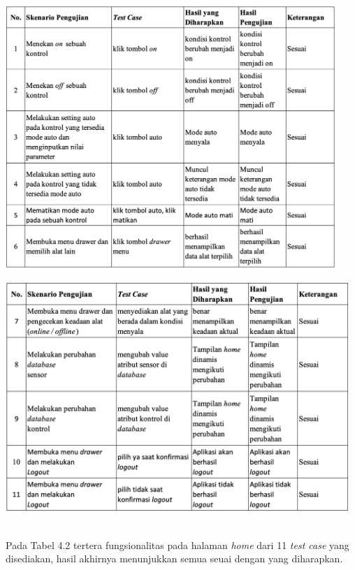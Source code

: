\begin{flushleft}
\begin{justify}
\begin{itemize}
\begin{table}[ht]
                    \includegraphics[width=12.5cm]{images/bab 4/fungsional-home1.png}\\
                    \end{table}
                \begin{table}[ht]
                    \centering
                    \includegraphics[width=13cm]{images/bab 4/fungsional-home2.png}\\
                    \end{table}
                \\[2cm]Pada Tabel 4.2 tertera fungsionalitas pada halaman \emph{home} dari 11 \emph{test case} yang disediakan, hasil akhirnya menunjukkan semua seuai dengan yang diharapkan.\\
            \end{itemize}
           

\end{justify}
\end{flushleft}
